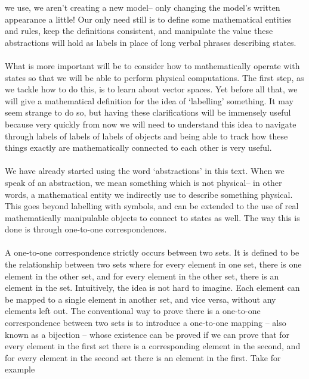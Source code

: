 we use, we aren't creating a new model-- only changing the model's written appearance a little! Our only need still is to define some mathematical entities and rules, keep the definitions consistent, and manipulate the value these abstractions will hold as labels in place of long verbal phrases describing states.
\\\\
What is more important will be to consider how to mathematically operate with states so that we will be able to perform physical computations. The first step, as we tackle how to do this, is to learn about vector spaces. Yet before all that, we will give a mathematical definition for the idea of `labelling' something. It may seem strange to do so, but having these clarifications will be immensely useful because very quickly from now we will need to understand this idea to navigate through labels of labels of labels of objects and being able to track how these things exactly are mathematically connected to each other is very useful.
\\\\
We have already started using the word `abstractions' in this text. When we speak of an abstraction, we mean something which is not physical-- in other words, a mathematical entity we indirectly use to describe something physical. This goes beyond labelling with symbols, and can be extended to the use of real mathematically manipulable objects to connect to states as well. The way this is done is through one-to-one correspondences.
\\\\
A one-to-one correspondence strictly occurs between two sets. It is defined to be the relationship between two sets where for every element in one set, there is one element in the other set, and for every element in the other set, there is an element in the set. Intuitively, the idea is not hard to imagine. Each element can be mapped to a single element in another set, and vice versa, without any elements left out. The conventional way to prove there is a one-to-one correspondence between two sets is to introduce a one-to-one mapping -- also known as a bijection -- whose existence can be proved if we can prove that for every element in the first set there is a corresponding element in the second, and for every element in the second set there is an element in the first. Take for example
